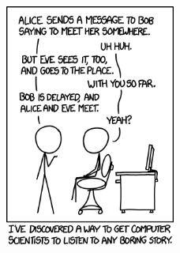 \begin{figure}[h]
	\begin{center}
		\includegraphics[width=0.5\textwidth]{img/protocol.png}
	\end{center}
\end{figure}

